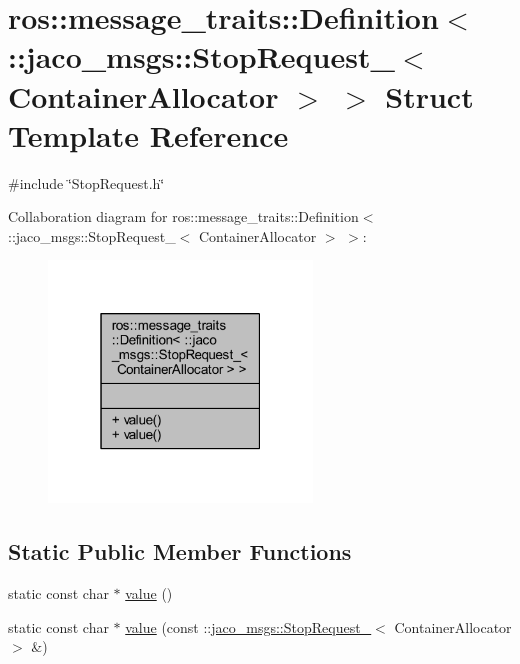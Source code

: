 \hypertarget{structros_1_1message__traits_1_1Definition_3_01_1_1jaco__msgs_1_1StopRequest___3_01ContainerAllocator_01_4_01_4}{}\section{ros\+:\+:message\+\_\+traits\+:\+:Definition$<$ \+:\+:jaco\+\_\+msgs\+:\+:Stop\+Request\+\_\+$<$ Container\+Allocator $>$ $>$ Struct Template Reference}
\label{structros_1_1message__traits_1_1Definition_3_01_1_1jaco__msgs_1_1StopRequest___3_01ContainerAllocator_01_4_01_4}


{\ttfamily \#include \char`\"{}Stop\+Request.\+h\char`\"{}}



Collaboration diagram for ros\+:\+:message\+\_\+traits\+:\+:Definition$<$ \+:\+:jaco\+\_\+msgs\+:\+:Stop\+Request\+\_\+$<$ Container\+Allocator $>$ $>$\+:
\nopagebreak
\begin{figure}[H]
\begin{center}
\leavevmode
\includegraphics[width=199pt]{d4/dd3/structros_1_1message__traits_1_1Definition_3_01_1_1jaco__msgs_1_1StopRequest___3_01ContainerAllocator_01_4_01_4__coll__graph}
\end{center}
\end{figure}
\subsection*{Static Public Member Functions}
\begin{DoxyCompactItemize}
\item 
static const char $\ast$ \hyperlink{structros_1_1message__traits_1_1Definition_3_01_1_1jaco__msgs_1_1StopRequest___3_01ContainerAllocator_01_4_01_4_ab2bf8b6f9d47a598da2e9f0870d7325f}{value} ()
\item 
static const char $\ast$ \hyperlink{structros_1_1message__traits_1_1Definition_3_01_1_1jaco__msgs_1_1StopRequest___3_01ContainerAllocator_01_4_01_4_a01828fbc9b45669a29c9a3314cb1c7dd}{value} (const \+::\hyperlink{structjaco__msgs_1_1StopRequest__}{jaco\+\_\+msgs\+::\+Stop\+Request\+\_\+}$<$ Container\+Allocator $>$ \&)
\end{DoxyCompactItemize}


